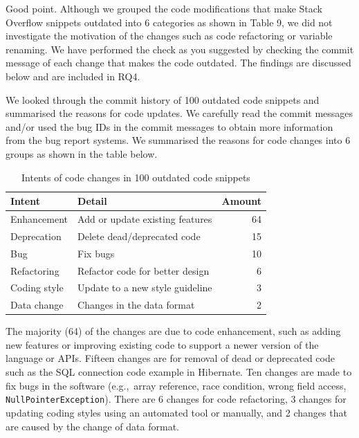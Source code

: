 \documentclass[a4paper,twoside,10pt]{reviewresponse}
\begin{document}
		

Good point. Although we grouped the code modifications that make Stack Overflow
snippets outdated into 6 categories as shown in Table 9, we did not investigate
the motivation of the changes such as code refactoring or variable renaming. We
have performed the check as you suggested by checking the commit message of each
change that makes the code outdated. The findings are discussed below and are
included in RQ4.

We looked through the commit history of 100 outdated code snippets and
summarised the reasons for code updates. We carefully read the commit messages
and/or used the bug IDs in the commit messages to obtain more information from
the bug report systems. We summarised the reasons for code changes into 6 groups
as shown in the table below.

\begin{table}[H]
	\centering
	\begin{tabular}{llr}
		\toprule
		Intent & Detail & Amount \\
		\midrule
		Enhancement & Add or update existing features & 64 \\
		Deprecation & Delete dead/deprecated code & 15 \\
		Bug & Fix bugs & 10 \\
		Refactoring & Refactor code for better design & 6 \\
		Coding style & Update to a new style guideline & 3 \\
		Data change & Changes in the data format & 2 \\
		\bottomrule
	\end{tabular}
	\label{tab:intent_outdated}
	\caption{Intents of code changes in 100 outdated code snippets}
\end{table}

The majority (64) of the changes are due to code enhancement, such as adding
new features or improving existing code to support a newer version of the
language or APIs. Fifteen changes are for removal of dead or deprecated code
such as the SQL connection code example in Hibernate. Ten changes are made to
fix bugs in the software (e.g.,~array reference, race condition, wrong field
access, \texttt{NullPointerException}). There are 6 changes for code
refactoring, 3 changes for updating coding styles using an automated tool or
manually, and 2 changes that are caused by the change of data format.
\end{document}
